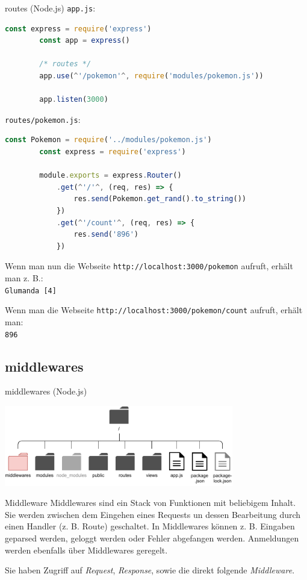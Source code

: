 \begin{example}{routes (Node.js)}
    \texttt{app.js}:
    \begin{lstlisting}[language=JavaScript]
        const express = require('express')
        const app = express()

        /* routes */
        app.use(^'/pokemon'^, require('modules/pokemon.js'))

        app.listen(3000)
    \end{lstlisting}

    \texttt{routes/pokemon.js}:
    \begin{lstlisting}[language=JavaScript]
        const Pokemon = require('../modules/pokemon.js')
        const express = require('express')
        
        module.exports = express.Router()
            .get(^'/'^, (req, res) => {
                res.send(Pokemon.get_rand().to_string())
            })
            .get(^'/count'^, (req, res) => {
                res.send('896')
            })
    \end{lstlisting}

    Wenn man nun die Webseite \texttt{http://localhost:3000/pokemon} aufruft, erhält man z. B.:\\
    \texttt{Glumanda [4]}

    Wenn man die Webseite \texttt{http://localhost:3000/pokemon/count} aufruft, erhält man:\\
    \texttt{896}
\end{example}

\subsection{middlewares}

\begin{bonus}{middlewares (Node.js)}
    \begin{center}
        \includegraphics[width=0.75\textwidth]{includes/figures/bonus_nodejs_middlewares.pdf}
    \end{center}
\end{bonus}

\begin{defi}{Middleware}
    Middlewares sind ein Stack von Funktionen mit beliebigem Inhalt.
    Sie werden zwischen dem Eingehen eines Requests un dessen Bearbeitung durch einen Handler (z. B. Route) geschaltet.
    In Middlewares können z. B. Eingaben geparsed werden, geloggt werden oder Fehler abgefangen werden.
    Anmeldungen werden ebenfalls über Middlewares geregelt.

    Sie haben Zugriff auf \emph{Request}, \emph{Response}, sowie die direkt folgende \emph{Middleware}.
\end{defi}


